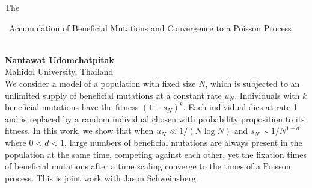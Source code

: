 \documentclass[12pt,a4paper]{article}
\newcommand{\ZAbst}{\rule[-1ex]{0pt}{2ex}\ } %
\begin{document}



\bigskip \bigskip  %

\noindent
{\Large The\ZAbst Accumulation of Beneficial Mutations and Convergence to a Poisson Process}\\[1ex]
{\large 
\textbf{Nantawat Udomchatpitak}\\[1ex] Mahidol University, Thailand}\\[2ex]
We consider a model of a population with fixed size $N$, which is subjected to an unlimited supply of beneficial mutations at a constant rate $u_N$. Individuals with $k$ beneficial mutations have the fitness $(1+s_N)^k$. Each individual dies at rate 1 and is replaced by a random individual chosen with probability proposition to its fitness. In this work, we show that when $u_N \ll 1/(N \log N )$ and $s_N \sim 1/N^{1-d}$ where $0<d<1$, large numbers of beneficial mutations are always present in the population at the same time, competing against each other, yet the fixation times of beneficial mutations after a time scaling converge to the times of a Poisson process. This is joint work with Jason Schweinsberg. 
\end{document}
